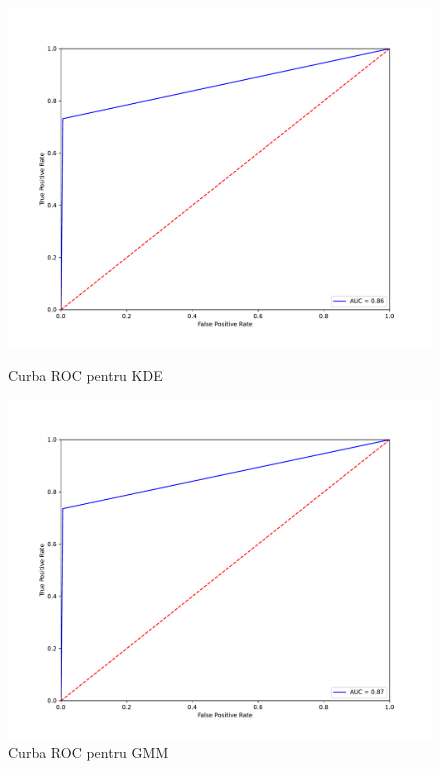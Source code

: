 \begin{figure}[!htb] %
    \begin{minipage}[t]{0.5\textwidth}
        \vspace{0pt}
        \includegraphics[width=\textwidth]{images/kde-roc.pdf}
        \caption{Curba ROC pentru KDE} 
    \end{minipage}
    \hfill
    \begin{minipage}[t]{0.5\textwidth}
        \vspace{0pt}
        \includegraphics[width=\textwidth]{images/gmm-roc.pdf}
        \caption{Curba ROC pentru GMM}
    \end{minipage}
    

\end{figure}
